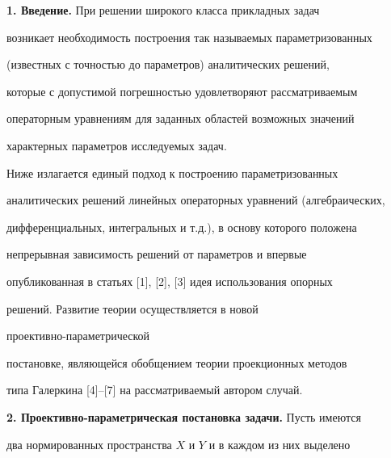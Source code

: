 \pagestyle{plain} %













\maketitle


\label{begin}





{\bf 1. Введение.} При решении широкого класса прикладных задач


возникает необходимость построения так называемых параметризованных


(известных с точностью до параметров) аналитических решений,


которые с допустимой погрешностью удовлетворяют рассматриваемым


операторным уравнениям для заданных областей возможных значений


характерных параметров исследуемых задач.





Ниже излагается единый подход к построению параметризованных


аналитических решений линейных операторных уравнений (алгебраических,


дифференциальных, интегральных и т.д.), в основу которого положена


непрерывная зависимость решений от параметров и впервые


опубликованная в статьях [1], [2], [3] идея использования опорных


решений. Развитие теории осуществляется в новой


проективно-параметрической


постановке, являющейся обобщением теории проекционных методов


типа Галеркина [4]--[7] на рассматриваемый автором случай.


\medskip





{\bf 2. Проективно-параметрическая постановка задачи.} Пусть имеются


два нормированных пространства $X$ и $Y$ и в каждом из них выделено


